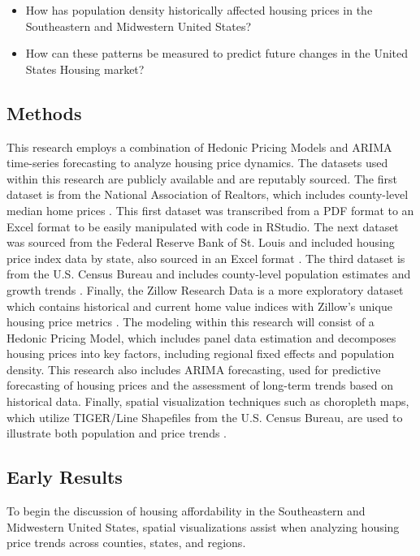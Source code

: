 \documentclass[journal,article,submit,pdftex,moreauthors]{Definitions/mdpi}
\begin{document}
\begin{itemize}
    \item How has population density historically affected housing prices in the Southeastern and Midwestern United States?
    \item How can these patterns be measured to predict future changes in the United States Housing market?
\end{itemize}

\subsection{Methods}

This research employs a combination of Hedonic Pricing Models and ARIMA time-series forecasting to analyze housing price dynamics. The datasets used within this research are publicly available and are reputably sourced. The first dataset is from the National Association of Realtors, which includes county-level median home prices \citep{_2024_county}. This first dataset was transcribed from a PDF format to an Excel format to be easily manipulated with code in RStudio. The next dataset was sourced from the Federal Reserve Bank of St. Louis and included housing price index data by state, also sourced in an Excel format \citep{a2024_hpi}. The third dataset is from the U.S. Census Bureau and includes county-level population estimates and growth trends \citep{_2023_county}. Finally, the Zillow Research Data is a more exploratory dataset which contains historical and current home value indices with Zillow’s unique housing price metrics \citep{zillow_2024_housing}. The modeling within this research will consist of a Hedonic Pricing Model, which includes panel data estimation and decomposes housing prices into key factors, including regional fixed effects and population density. This research also includes ARIMA forecasting, used for predictive forecasting of housing prices and the assessment of long-term trends based on historical data. Finally, spatial visualization techniques such as choropleth maps, which utilize TIGER/Line Shapefiles from the U.S. Census Bureau, are used to illustrate both population and price trends \citep{unitedstatescensusbureau_2024_tigerline}.

\subsection{Early Results}

To begin the discussion of housing affordability in the Southeastern and Midwestern United States, spatial visualizations assist when analyzing housing price trends across counties, states, and regions. 
\end{document}
